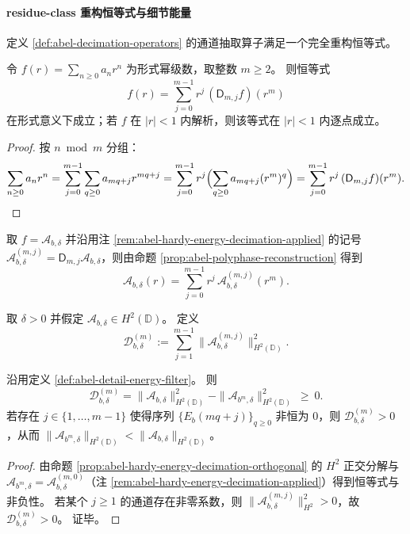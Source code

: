 \paragraph{residue-class 重构恒等式与细节能量}
定义 \ref{def:abel-decimation-operators} 的通道抽取算子满足一个完全重构恒等式。
\begin{proposition}\label{prop:abel-polyphase-reconstruction}
令 \(f(r)=\sum_{n\ge 0}a_nr^n\) 为形式幂级数，取整数 \(m\ge 2\)。
则恒等式
\[
\boxed{\ f(r)=\sum_{j=0}^{m-1}r^j\,(\mathsf D_{m,j}f)(r^m)\ }
\]
在形式意义下成立；若 \(f\) 在 \(|r|<1\) 内解析，则该等式在 \(|r|<1\) 内逐点成立。
\end{proposition}
\begin{proof}
按 \(n\bmod m\) 分组：
\[
\sum_{n\ge 0}a_nr^n
=\sum_{j=0}^{m-1}\sum_{q\ge 0}a_{mq+j}r^{mq+j}
=\sum_{j=0}^{m-1}r^j\Bigl(\sum_{q\ge 0}a_{mq+j}(r^m)^q\Bigr)
=\sum_{j=0}^{m-1}r^j\,(\mathsf D_{m,j}f)(r^m).
\]
\end{proof}

取 \(f=\mathcal A_{b,\delta}\) 并沿用注 \ref{rem:abel-hardy-energy-decimation-applied} 的记号
\(
\mathcal A_{b,\delta}^{(m,j)}=\mathsf D_{m,j}\mathcal A_{b,\delta}
\)，则由命题 \ref{prop:abel-polyphase-reconstruction} 得到
\[
\boxed{\ \mathcal A_{b,\delta}(r)=\sum_{j=0}^{m-1}r^j\,\mathcal A_{b,\delta}^{(m,j)}(r^m).\ }
\]

\begin{definition}[细节能量滤波器]\label{def:abel-detail-energy-filter}
取 \(\delta>0\) 并假定 \(\mathcal A_{b,\delta}\in H^2(\mathbb D)\)。
定义
\[
\boxed{\ \mathcal D_{b,\delta}^{(m)}:=\sum_{j=1}^{m-1}\|\mathcal A_{b,\delta}^{(m,j)}\|_{H^2(\mathbb D)}^2.\ }
\]
\end{definition}

\begin{proposition}[能量预算恒等式与严格耗散]\label{prop:abel-detail-energy-budget}
沿用定义 \ref{def:abel-detail-energy-filter}。
则
\[
\boxed{\ \mathcal D_{b,\delta}^{(m)}
=\|\mathcal A_{b,\delta}\|_{H^2(\mathbb D)}^2-\|\mathcal A_{b^m,\delta}\|_{H^2(\mathbb D)}^2\ \ge\ 0.\ }
\]
若存在 \(j\in\{1,\dots,m-1\}\) 使得序列 \(\{E_b(mq+j)\}_{q\ge 0}\) 非恒为 \(0\)，则 \(\mathcal D_{b,\delta}^{(m)}>0\)，从而
\(
\|\mathcal A_{b^m,\delta}\|_{H^2(\mathbb D)}<\|\mathcal A_{b,\delta}\|_{H^2(\mathbb D)}
\)。
\end{proposition}
\begin{proof}
由命题 \ref{prop:abel-hardy-energy-decimation-orthogonal} 的 \(H^2\) 正交分解与
\(\mathcal A_{b^m,\delta}=\mathcal A_{b,\delta}^{(m,0)}\)（注 \ref{rem:abel-hardy-energy-decimation-applied}）得到恒等式与非负性。
若某个 \(j\ge 1\) 的通道存在非零系数，则 \(\|\mathcal A_{b,\delta}^{(m,j)}\|_{H^2}^2>0\)，故 \(\mathcal D_{b,\delta}^{(m)}>0\)。
证毕。
\end{proof}

